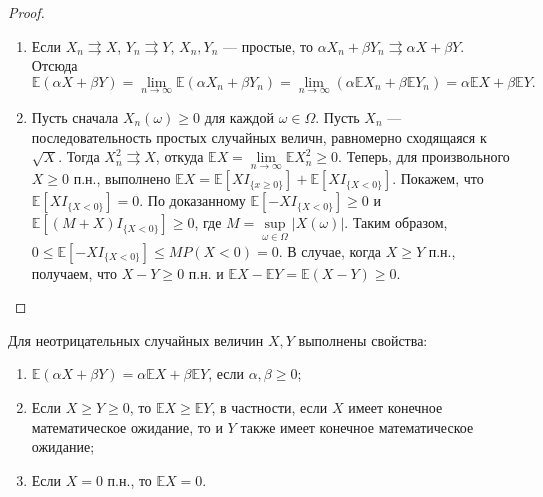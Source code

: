 \begin{proof}~
    \begin{enumerate}
        \item Если $X_n \rightrightarrows X$, $Y_n \rightrightarrows Y$, $X_n, Y_n$ --- простые, то $\alpha X_n + \beta Y_n \rightrightarrows \alpha X + \beta Y$.
        Отсюда
        \[
            \mathbb{E}(\alpha X + \beta Y) = \lim\limits_{n \to \infty}\mathbb{E}(\alpha X_n + \beta Y_n) = \lim\limits_{n \to \infty}(\alpha \mathbb{E} X_n + \beta \mathbb{E} Y_n) = \alpha \mathbb{E} X + \beta \mathbb{E} Y.
        \]
        \item Пусть сначала $X_n(\omega) \geqslant 0$ для каждой $\omega \in \Omega$.
        Пусть $X_n$ --- последовательность простых случайных величн, равномерно сходящаяся к $\sqrt{X}$.
        Тогда $X_n^2 \rightrightarrows X$, откуда $\mathbb{E}X = \lim\limits_{n \to \infty}\mathbb{E}X_n^2 \geqslant 0$.
        Теперь, для произвольного $X \geqslant 0$ п.н., выполнено $\mathbb{E}X = \mathbb{E}[X I_{\{x \geqslant 0\}}] + \mathbb{E}[X I_{\{X < 0\}}]$.
        Покажем, что $\mathbb{E}[X I_{\{X < 0\}}] = 0$.
        По доказанному $\mathbb{E}[-X I_{\{ X < 0 \}}] \geqslant 0$ и $\mathbb{E}[(M + X) I_{\{X < 0\}}] \geqslant 0$, где $M = \sup\limits_{\omega \in \Omega}|X(\omega)|$.
        Таким образом, $0 \leqslant \mathbb{E}[-X I_{\{ X < 0 \}}] \leqslant M P(X < 0) = 0$.
        В случае, когда $X \geqslant Y$ п.н., получаем, что $X - Y \geqslant 0$ п.н. и $\mathbb{E}X - \mathbb{E}Y = \mathbb{E}(X - Y) \geqslant 0$.
    \end{enumerate}
\end{proof}


\begin{proposal*}
    Для неотрицательных случайных величин $X, Y$ выполнены свойства:
    \begin{enumerate}
        \item $\mathbb{E}(\alpha X + \beta Y) = \alpha\mathbb{E} X + \beta\mathbb{E} Y$, если $\alpha, \beta \geqslant 0$;
        \item Если $X \geqslant Y \geqslant 0$, то $\mathbb{E} X \geqslant \mathbb{E} Y$, в частности, если $X$ имеет конечное математическое ожидание, то и $Y$ также имеет конечное математическое ожидание;
        \item Если $X = 0$ п.н., то $\mathbb{E}X = 0$.
    \end{enumerate}
\end{proposal*}

